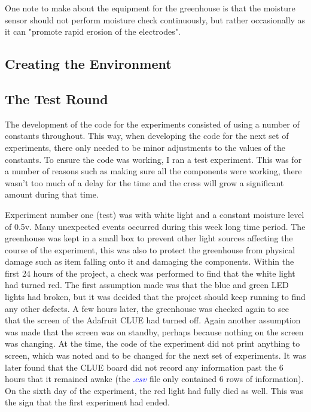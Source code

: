One note to make about the equipment for the greenhouse is that the moisture sensor should not perform moisture check continuously, but rather occasionally as it can "promote rapid erosion of the electrodes".


\subsection{Creating the Environment}


\subsection{The Test Round}

The development of the code for the experiments consisted of using a number of constants throughout. This way, when developing the code for the next set of experiments, there only needed to be minor adjustments to the values of the constants. To ensure the code was working, I ran a test experiment. This was for a number of reasons such as making sure all the components were working, there wasn't too much of a delay for the time and the cress will grow a significant amount during that time.

Experiment number one (test) was with white light and a constant moisture level of 0.5v. Many unexpected events occurred during this week long time period. The greenhouse was kept in a small box to prevent other light sources affecting the course of the experiment, this was also to protect the greenhouse from physical damage such as item falling onto it and damaging the components. Within the first 24 hours of the project, a check was performed to find that the white light had turned red. The first assumption made was that the blue and green LED lights had broken, but it was decided that the project should keep running to find any other defects. A few hours later, the greenhouse was checked again to see that the screen of the Adafruit CLUE had turned off. Again another assumption was made that the screen was on standby, perhaps because nothing on the screen was changing. At the time, the code of the experiment did not print anything to screen, which was noted and to be changed for the next set of experiments. It was later found that the CLUE board did not record any information past the 6 hours that it remained awake (the \textcolor{blue}{$.csv$} file only contained 6 rows of information). On the sixth day of the experiment, the red light had fully died as well. This was the sign that the first experiment had ended. 

